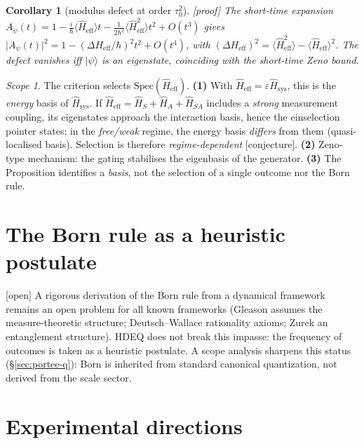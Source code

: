 \documentclass[11pt,a4paper]{article}
\newcommand{\ket}[1]{\lvert #1\rangle}
\newcommand{\Hsysop}{\hat{H}_{\mathrm{sys}}}
\newcommand{\Heff}{\hat{H}_{\mathrm{eff}}}
\newcommand{\statut}[1]{{\footnotesize\textsf{[#1]}}}
\theoremstyle{plain}
\newtheorem{corollary}{Corollary}
\theoremstyle{definition}
\theoremstyle{remark}
\newtheorem*{scope}{Scope}
\begin{document}
\begin{corollary}[modulus defect at order $\tau_0^2$]\statut{proof}
The short-time expansion $A_\psi(t)=1-\tfrac{i}{\hbar}\langle\Heff\rangle t-\tfrac{1}{2\hbar^2}\langle\Heff^2\rangle t^2+O(t^3)$ gives $\lvert A_\psi(t)\rvert^2=1-(\Delta H_{\mathrm{eff}}/\hbar)^2 t^2+O(t^4)$, with
$(\Delta H_{\mathrm{eff}})^2=\langle\Heff^2\rangle-\langle\Heff\rangle^2$. The
defect vanishes iff $\ket{\psi}$ is an eigenstate, coinciding with the
short-time Zeno bound.
\end{corollary}

\begin{scope}
The criterion selects $\mathrm{Spec}(\Heff)$. \textbf{(1)} With
$\Heff=\varepsilon\Hsysop$, this is the \emph{energy} basis of $\Hsysop$. If
$\Heff=\hat H_S+\hat H_A+\hat H_{SA}$ includes a \emph{strong} measurement
coupling, its eigenstates approach the interaction basis, hence the einselection
pointer states; in the \emph{free/weak} regime, the energy basis \emph{differs}
from them (quasi-localised basis). Selection is therefore \emph{regime-dependent}
\statut{conjecture}. \textbf{(2)} Zeno-type mechanism: the gating stabilises the
eigenbasis of the generator. \textbf{(3)} The Proposition identifies a
\emph{basis}, not the selection of a single outcome nor the Born rule.
\end{scope}

\section{The Born rule as a heuristic postulate}
\statut{open} A rigorous derivation of the Born rule from a dynamical framework
remains an open problem for all known frameworks (Gleason assumes the
measure-theoretic structure; Deutsch--Wallace rationality axioms; Zurek an
entanglement structure). HDEQ does not break this impasse: the frequency of
outcomes is taken as a heuristic postulate. A scope analysis sharpens this status (\S\ref{sec:portee-q}): Born is inherited from standard canonical quantization, not derived from the scale sector.

\section{Experimental directions}\label{sec:exp}
\end{document}
